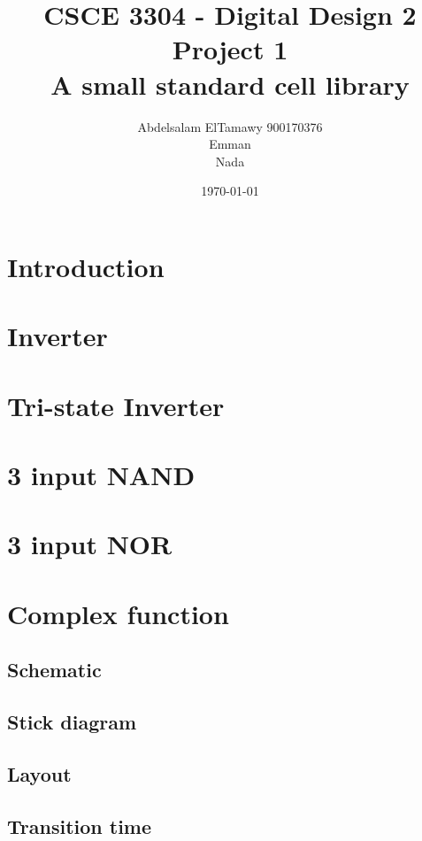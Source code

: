 \documentclass[]{article}
\author{Abdelsalam ElTamawy 900170376\\Emman\\Nada}
\date{\today}
\title{CSCE 3304 - Digital Design 2\\Project 1\\A small standard cell library\\}
\begin{document}
	
\begin{titlepage}
	\maketitle
\end{titlepage}

\tableofcontents

\pagebreak

\section{Introduction}

\section{Inverter}

\section{Tri-state Inverter}

\section{3 input NAND}

\section{3 input NOR}

\section{Complex function}

\subsection{Schematic}

\subsection{Stick diagram}

\subsection{Layout}

\subsection{Transition time}
\end{document}
